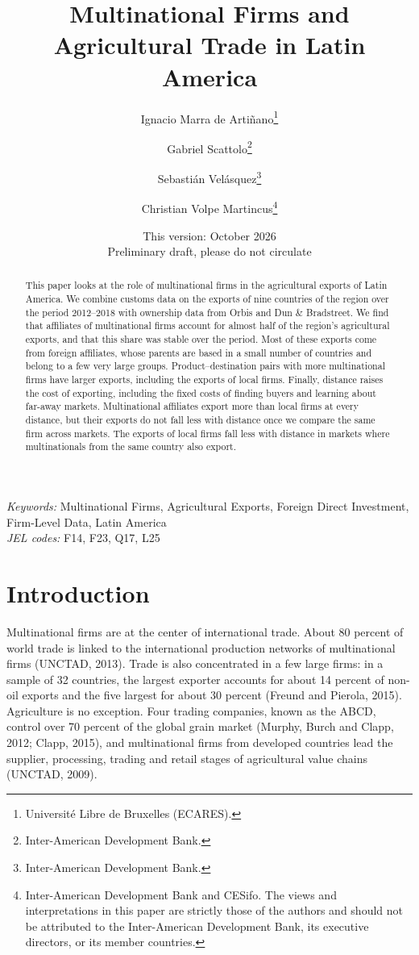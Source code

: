 \documentclass[11pt,a4paper]{article}
\title{Multinational Firms and Agricultural Trade in Latin America}
\author{Ignacio Marra de Arti\~nano\thanks{Universit\'e Libre de Bruxelles (ECARES).}
 \and Gabriel Scattolo\thanks{Inter-American Development Bank.}
 \and Sebasti\'an Vel\'asquez\thanks{Inter-American Development Bank.}
 \and Christian Volpe Martincus\thanks{Inter-American Development Bank and CESifo. The views and
interpretations in this paper are strictly those of the authors and should not be attributed to
the Inter-American Development Bank, its executive directors, or its member countries.}}
\date{This version: October 2026 \\[2pt] \small Preliminary draft, please do not circulate}
\begin{document}
\maketitle
\thispagestyle{empty}
\begin{abstract}\noindent
This paper looks at the role of multinational firms in the agricultural exports of Latin America.
We combine customs data on the exports of nine countries of the region over the period 2012--2018
with ownership data from Orbis and Dun \& Bradstreet. We find that affiliates of multinational
firms account for almost half of the region's agricultural exports, and that this share was
stable over the period. Most of these exports come from foreign affiliates, whose parents are
based in a small number of countries and belong to a few very large groups. Product--destination
pairs with more multinational firms have larger exports, including the exports of local firms.
Finally, distance raises the cost of exporting, including the fixed costs of finding buyers and
learning about far-away markets. Multinational affiliates export more than local firms at every
distance, but their exports do not fall less with distance once we compare the same firm across
markets. The exports of local firms fall less with distance in markets where multinationals from
the same country also export.
\end{abstract}
\vspace{4pt}
\noindent\textit{Keywords:} Multinational Firms, Agricultural Exports, Foreign Direct Investment, Firm-Level Data, Latin America \\
\noindent\textit{JEL codes:} F14, F23, Q17, L25
\clearpage
\tableofcontents
\clearpage

\section{Introduction}\label{sec:intro}
Multinational firms are at the center of international trade. About 80 percent of world trade is
linked to the international production networks of multinational firms (UNCTAD, 2013). Trade is
also concentrated in a few large firms: in a sample of 32 countries, the largest exporter accounts
for about 14 percent of non-oil exports and the five largest for about 30 percent (Freund and
Pierola, 2015). Agriculture is no exception. Four trading companies, known as the ABCD, control
over 70 percent of the global grain market (Murphy, Burch and Clapp, 2012; Clapp, 2015), and
multinational firms from developed countries lead the supplier, processing, trading and retail
stages of agricultural value chains (UNCTAD, 2009).
\end{document}
